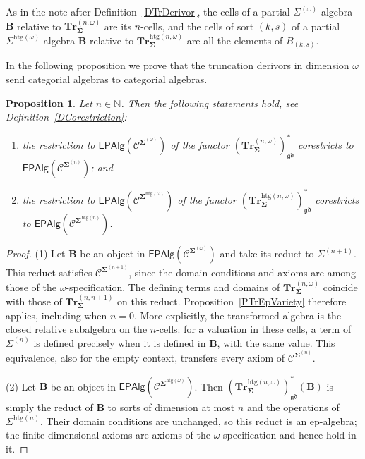 \documentclass[a4paper, reqno]{amsbook}
\newcommand{\sig}[1]{\mathbf{#1}}             %
\newcommand{\spec}[1]{\boldsymbol{\mathcal{#1}}} %
\newcommand{\gd}{\mathfrak{gd}}              %
\newcommand{\htg}{\mathrm{htg}}                %
\newcommand{\bTr}{\mathbf{Tr}}
\theoremstyle{plain}
\newtheorem{proposition}[theorem]{Proposition}
\theoremstyle{definition}
\begin{document}
As in the note after Definition~\ref{DTrDerivor}, the cells of a partial $\Sigma^{(\omega)}$-algebra $\mathbf{B}$ relative to $\bTr^{(n,\omega)}_{\sig{\Sigma}}$ are its $n$-cells, and the cells of sort $(k,s)$ of a partial $\Sigma^{\htg(\omega)}$-algebra $\mathbf{B}$ relative to $\bTr^{\htg(n,\omega)}_{\sig{\Sigma}}$ are all the elements of $B_{(k,s)}$.

In the following proposition we prove that the truncation derivors in dimension $\omega$ send categorial algebras to categorial algebras.

\begin{proposition}\label{PTrEpVarietyOmega}
Let $n\in\mathbb{N}$.
Then the following statements hold, see Definition~\ref{DCorestriction}:
\begin{enumerate}
\item the restriction to $\mathsf{EPAlg}(\spec{C}^{\sig{\Sigma}^{(\omega)}})$ of the functor $(\bTr^{(n,\omega)}_{\sig{\Sigma}})^{\ast}_{\gd}$ corestricts to $\mathsf{EPAlg}(\spec{C}^{\sig{\Sigma}^{(n)}})$; and
\item the restriction to $\mathsf{EPAlg}(\spec{C}^{\sig{\Sigma}^{\htg(\omega)}})$ of the functor $(\bTr^{\htg(n,\omega)}_{\sig{\Sigma}})^{\ast}_{\gd}$ corestricts to $\mathsf{EPAlg}(\spec{C}^{\sig{\Sigma}^{\htg(n)}})$.
\end{enumerate}
\end{proposition}
\begin{proof}
(1) Let $\mathbf{B}$ be an object in $\mathsf{EPAlg}(\spec{C}^{\sig{\Sigma}^{(\omega)}})$ and take its reduct to $\Sigma^{(n+1)}$.
This reduct satisfies $\spec{C}^{\sig{\Sigma}^{(n+1)}}$, since the domain conditions and axioms are among those of the $\omega$-specification.
The defining terms and domains of $\bTr^{(n,\omega)}_{\sig{\Sigma}}$ coincide with those of $\bTr^{(n,n+1)}_{\sig{\Sigma}}$ on this reduct.
Proposition~\ref{PTrEpVariety} therefore applies, including when $n=0$.
More explicitly, the transformed algebra is the closed relative subalgebra on the $n$-cells: for a valuation in these cells, a term of $\Sigma^{(n)}$ is defined precisely when it is defined in $\mathbf{B}$, with the same value.
This equivalence, also for the empty context, transfers every axiom of $\spec{C}^{\sig{\Sigma}^{(n)}}$.

(2) Let $\mathbf{B}$ be an object in $\mathsf{EPAlg}(\spec{C}^{\sig{\Sigma}^{\htg(\omega)}})$.
Then $(\bTr^{\htg(n,\omega)}_{\sig{\Sigma}})^{\ast}_{\gd}(\mathbf{B})$ is simply the reduct of $\mathbf{B}$ to sorts of dimension at most $n$ and the operations of $\Sigma^{\htg(n)}$.
Their domain conditions are unchanged, so this reduct is an ep-algebra; the finite-dimensional axioms are axioms of the $\omega$-specification and hence hold in it.
\end{proof}
\end{document}
